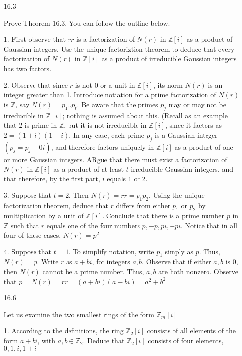 \documentclass[12pt]{article}
\begin{document}
\begin{itemize}

\newpage 
\item[16.3]

Prove Theorem 16.3. You can follow the outline below.

1. First observe that $r\bar{r}$ is a factorization of $N(r)$ in $\mathbb{Z}[i]$ as a product of Gaussian integers. Use the unique factoriztion theorem to deduce that every factorization of $N(r)$ in $\mathbb{Z}[i]$ as a product of irreducible Gaussian integers has two factors.

2. Observe that since $r$ is not 0 or a unit in $\mathbb{Z}[i]$, its norm $N(r)$ is an integer greater than 1. Introduce notiation for a prime factorization of $N(r)$ is $\mathbb{Z}$, say $N(r) = p_1 .. p_t$. Be aware that the primes $p_j$ may or may not be irreducible in $\mathbb{Z}[i]$; nothing is assumed about this. (Recall as an example that 2 is prime in $\mathbb{Z}$, but it is not irreducible in $\mathbb{Z}[i]$, since it factors as $2 = (1+i)(1-i)$. In any case, each prime $p_j$ is a Gaussian integer $(p_j = p_j + 0i)$, and therefore factors uniquely in $\mathbb{Z}[i]$ as a product of one or more Gaussian integers. ARgue that there must exist a factorization of $N(r)$ in $\mathbb{Z}[i]$ as a product of at least $t$ irreducible Gaussian integers, and that therefore, by the first part, $t$ equals 1 or 2.

3. Suppose that $t = 2$. Then $N(r) = r\bar{r} = p_1 p_2$. Using the unique factorization theorem, deduce that $r$ differs from either $p_1$ or $p_2$ by multiplication by a unit of $\mathbb{Z}[i]$. Conclude that there is a prime number $p$ in $\mathbb{Z}$ such that $r$ equals one of the four numbers $p, -p, pi, -pi$. Notice that in all four of these cases, $N(r) = p^2$

4. Suppose that $t = 1$. To simplify notation, write $p_1$ simply as $p$. Thus, $N(r) = p$. Write $r$ as $a + bi$, for integers $a,b$. Observe that if either $a, b$ is 0, then $N(r)$ cannot be a prime number. Thus, $a,b$ are both nonzero. Observe that $p = N(r) = r\bar{r} = (a+bi)(a-bi) = a^2 + b^2$

\newpage
\item[16.6]

Let us examine the two smallest rings of the form $\mathbb{Z}_m[i]$

1. According to the definitions, the ring $\mathbb{Z}_2 [i]$ consists of all elements of the form $a+ bi$, with $a,b \in \mathbb{Z}_2$. Deduce that $\mathbb{Z}_2[i]$ consists of four elements, $0, 1, i, 1+i$


\end{itemize}
\end{document}
